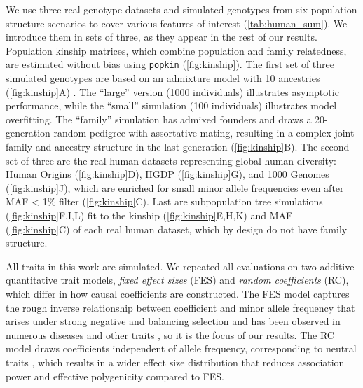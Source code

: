 \documentclass[11pt]{article}
\begin{document}
\begin{linenumbers}
We use three real genotype datasets and simulated genotypes from six population structure scenarios to cover various features of interest (\cref{tab:human_sum}).
We introduce them in sets of three, as they appear in the rest of our results.
Population kinship matrices, which combine population and family relatedness, are estimated without bias using \texttt{popkin} \citep{ochoa_estimating_2021} (\cref{fig:kinship}).
The first set of three simulated genotypes are based on an admixture model with 10 ancestries (\cref{fig:kinship}A) \citep{ochoa_estimating_2021, gopalan_scaling_2016, cabreros_likelihood-free_2019}.
The ``large'' version (1000 individuals) illustrates asymptotic performance, while the ``small'' simulation (100 individuals) illustrates model overfitting.
The ``family'' simulation has admixed founders and draws a 20-generation random pedigree with assortative mating, resulting in a complex joint family and ancestry structure in the last generation (\cref{fig:kinship}B).
The second set of three are the real human datasets representing global human diversity: Human Origins (\cref{fig:kinship}D), HGDP (\cref{fig:kinship}G), and 1000 Genomes (\cref{fig:kinship}J), which are enriched for small minor allele frequencies even after MAF < 1\% filter (\cref{fig:kinship}C).
Last are subpopulation tree simulations (\cref{fig:kinship}F,I,L) fit to the kinship (\cref{fig:kinship}E,H,K) and MAF (\cref{fig:kinship}C) of each real human dataset, which by design do not have family structure.

All traits in this work are simulated.
We repeated all evaluations on two additive quantitative trait models, \textit{fixed effect sizes} (FES) and \textit{random coefficients} (RC), which differ in how causal coefficients are constructed.
The FES model captures the rough inverse relationship between coefficient and minor allele frequency that arises under strong negative and balancing selection and has been observed in numerous diseases and other traits \citep{park_distribution_2011, zeng_signatures_2018, simons_population_2018, oconnor_extreme_2019}, so it is the focus of our results.
The RC model draws coefficients independent of allele frequency, corresponding to neutral traits \citep{zeng_signatures_2018, simons_population_2018}, which results in a wider effect size distribution that reduces association power and effective polygenicity compared to FES.


\end{linenumbers}
\end{document}
